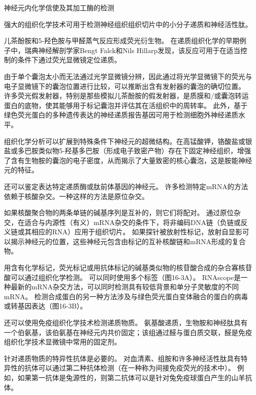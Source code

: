 \begin{proposition}[神经解剖学导航术语] \label{box:16_2}
	
	\quad \quad 神经元内化学信使及其加工酶的检测
	
	\quad \quad 强大的组织化学技术可用于检测神经组织组织切片中的小分子递质和神经活性肽。
	
	\quad \quad 儿茶酚胺和5-羟色胺与甲醛蒸气反应形成荧光衍生物。
	在递质组织化学的早期例子中，瑞典神经解剖学家Bengt Falck和Nils Hillarp发现，该反应可用于在适当控制的条件下通过荧光显微镜定位递质。
	
	\quad \quad 由于单个囊泡太小而无法通过光学显微镜分辨，因此通过将光学显微镜下的荧光与电子显微镜下的囊泡位置进行比较，可以推断出含有发射器的囊泡的确切位置。
	许多荧光假发射器，特别是那些模拟儿茶酚胺的假发射器，是质膜和/或囊泡转运蛋白的底物，使其能够用于标记囊泡并评估其在活组织中的周转率。
	此外，基于绿色荧光蛋白的多种遗传表达的神经递质报告基因可用于检测细胞外神经递质水平。
	
	\quad \quad 组织化学分析可以扩展到特殊条件下神经元的超微结构。在高锰酸钾，铬酸盐或银盐或多巴胺类似物5-羟基多巴胺（形成电子致密产物）存在下固定神经组织，增强了含有生物胺的囊泡的电子密度，从而揭示了大量致密的核心囊泡，这是胺能神经元的特征。
	
	\quad \quad 还可以鉴定表达特定递质酶或肽前体基因的神经元。
	许多检测特定mRNA的方法依赖于核酸杂交。一种这样的方法是原位杂交。
	
	\quad \quad 如果核酸聚合物的两条单链的碱基序列是互补的，则它们将配对。
	通过原位杂交，在适合与内源性（有义）mRNA杂交的条件下，将非编码DNA链（负链或反义链或其相应的RNA）应用于组织切片。
	如果探针被放射性标记，放射自显影可以揭示神经元的位置，这些神经元包含由标记的互补核酸链和mRNA形成的复合物。
	
	\quad \quad 用含有化学标记，荧光标记或用抗体标记的碱基类似物的核苷酸合成的杂合寡核苷酸可以通过组织化学检测。
	可以同时使用多个标签（图16-3A）。
	RNAscope是一种最新的mRNA杂交方法，可以同时检测具有较低背景和单分子灵敏度的不同mRNA。
	检测合成蛋白的另一种方法涉及与绿色荧光蛋白变体融合的蛋白的病毒或转基因表达（图16-3B）。
	
	\quad \quad 还可以使用免疫组织化学技术检测递质物质。
	氨基酸递质，生物胺和神经肽具有一个伯氨基，该伯氨基在神经元内共价固定；该组通过醛与蛋白质交联，醛是免疫组织化学技术显微镜中常用的固定剂。
	
	\quad \quad 针对递质物质的特异性抗体是必要的。
	对血清素、组胺和许多神经活性肽具有特异性的抗体可以通过第二种抗体检测（在一种称为间接免疫荧光的技术中）。
	例如，如果第一抗体是兔源性的，则第二抗体可以是针对兔免疫球蛋白产生的山羊抗体。
	

\end{proposition}
